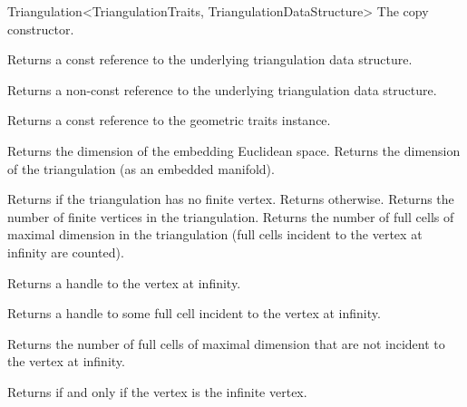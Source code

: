 \begin{ccRefClass}{Triangulation<TriangulationTraits, TriangulationDataStructure>}
{The copy constructor.}%



%
{Returns a const reference to the underlying triangulation data structure.}

\begin{ccAdvanced}
%
{Returns a non-const 
reference to the underlying triangulation data structure.}
\end{ccAdvanced}

%
{Returns a const reference to the geometric traits instance.}

%
{Returns the dimension of the embedding Euclidean space.}
\ccGlue
{}%
{Returns the dimension of the triangulation (as an embedded manifold).}

%
{Returns  if the triangulation has no finite vertex. Returns
 otherwise.}
\ccGlue
{}%
{Returns the number of finite vertices in the triangulation.}
\ccGlue
{}%
{Returns the number of full cells of maximal dimension in the triangulation
(full cells incident to the vertex at infinity are counted).}

%
{Returns a handle to the vertex at infinity.}

%
{Returns a handle to some full cell incident to the vertex at infinity.}


%
{Returns the number of full cells of maximal dimension that are not
  incident to the vertex at infinity.}


{Returns  if and only if the vertex  is the infinite vertex.}

\ccGlue


\end{ccRefClass}
